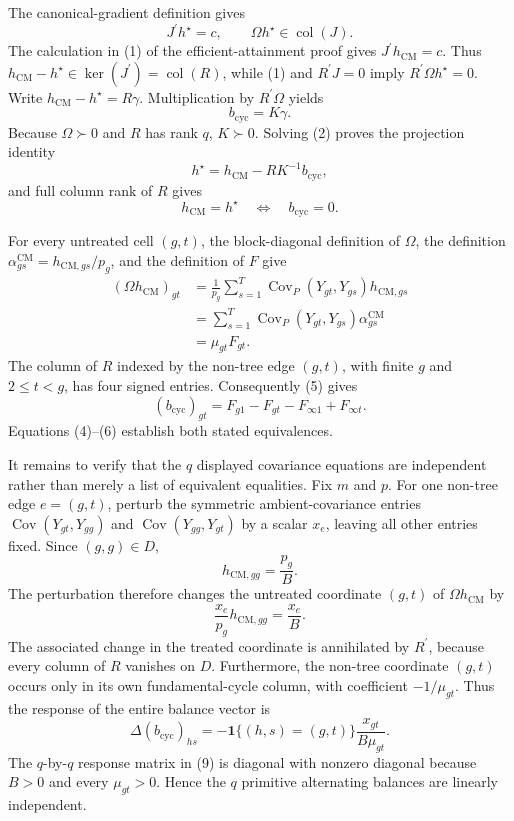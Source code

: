 The canonical-gradient definition gives
\[
J^{\prime}h^{\star}=c,
\qquad
\Omega h^{\star}\in\operatorname{col}(J).                             \tag{1}
\]
The calculation in (1) of the efficient-attainment proof gives
\(J^{\prime}h_{\mathrm{CM}}=c\).  Thus
\(h_{\mathrm{CM}}-h^{\star}\in\ker(J^{\prime})=\operatorname{col}(R)\), while (1) and \(R^{\prime}J=0\) imply
\(R^{\prime}\Omega h^{\star}=0\).  Write
\(h_{\mathrm{CM}}-h^{\star}=R\gamma\).  Multiplication by \(R^{\prime}\Omega\) yields
\[
b_{\mathrm{cyc}}=K\gamma.                                              \tag{2}
\]
Because \(\Omega\succ0\) and \(R\) has rank \(q\), \(K\succ0\).  Solving (2) proves the projection identity
\[
h^{\star}=h_{\mathrm{CM}}-RK^{-1}b_{\mathrm{cyc}},                     \tag{3}
\]
and full column rank of \(R\) gives
\[
h_{\mathrm{CM}}=h^{\star}
\quad\Longleftrightarrow\quad
b_{\mathrm{cyc}}=0.                                                     \tag{4}
\]

For every untreated cell \((g,t)\), the block-diagonal definition of \(\Omega\), the definition
\(\alpha^{\mathrm{CM}}_{gs}=h_{\mathrm{CM},gs}/p_g\), and the definition of \(F\) give
\[
\begin{aligned}
(\Omega h_{\mathrm{CM}})_{gt}
&=\frac1{p_g}\sum_{s=1}^T
 \operatorname{Cov}_P(Y_{gt},Y_{gs})h_{\mathrm{CM},gs}\\
&=\sum_{s=1}^T
 \operatorname{Cov}_P(Y_{gt},Y_{gs})\alpha^{\mathrm{CM}}_{gs}\\
&=\mu_{gt}F_{gt}.                                                       \tag{5}
\end{aligned}
\]
The column of \(R\) indexed by the non-tree edge \((g,t)\), with finite \(g\) and \(2\le t<g\), has four signed entries.  Consequently (5) gives
\[
(b_{\mathrm{cyc}})_{gt}
=F_{g1}-F_{gt}-F_{\infty1}+F_{\infty t}.                               \tag{6}
\]
Equations (4)--(6) establish both stated equivalences.

It remains to verify that the \(q\) displayed covariance equations are independent rather than merely a list of equivalent equalities.  Fix \(m\) and \(p\).  For one non-tree edge \(e=(g,t)\), perturb the symmetric ambient-covariance entries
\(\operatorname{Cov}(Y_{gt},Y_{gg})\) and
\(\operatorname{Cov}(Y_{gg},Y_{gt})\) by a scalar \(x_e\), leaving all other entries fixed.  Since \((g,g)\in D\),
\[
h_{\mathrm{CM},gg}=\frac{p_g}{B}.                                      \tag{7}
\]
The perturbation therefore changes the untreated coordinate \((g,t)\) of \(\Omega h_{\mathrm{CM}}\) by
\[
\frac{x_e}{p_g}h_{\mathrm{CM},gg}=\frac{x_e}{B}.                       \tag{8}
\]
The associated change in the treated coordinate is annihilated by \(R^{\prime}\), because every column of \(R\) vanishes on \(D\).  Furthermore, the non-tree coordinate \((g,t)\) occurs only in its own fundamental-cycle column, with coefficient \(-1/\mu_{gt}\).  Thus the response of the entire balance vector is
\[
\Delta(b_{\mathrm{cyc}})_{hs}
=-\mathbf 1\{(h,s)=(g,t)\}\frac{x_{gt}}{B\mu_{gt}}.                  \tag{9}
\]
The \(q\)-by-\(q\) response matrix in (9) is diagonal with nonzero diagonal because \(B>0\) and every \(\mu_{gt}>0\).  Hence the \(q\) primitive alternating balances are linearly independent.

